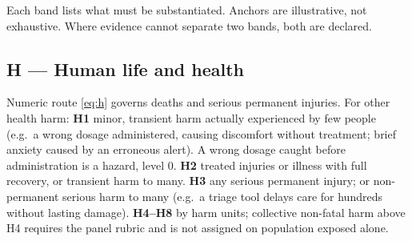 \documentclass[11pt,a4paper]{article}
\begin{document}
Each band lists what must be substantiated. Anchors are illustrative, not exhaustive. Where evidence cannot separate two bands, both are declared.

\subsection{H --- Human life and health}
Numeric route \eqref{eq:h} governs deaths and serious permanent injuries. For other health harm: \textbf{H1} minor, transient harm actually experienced by few people (e.g.\ a wrong dosage administered, causing discomfort without treatment; brief anxiety caused by an erroneous alert). A wrong dosage caught before administration is a hazard, level 0. \textbf{H2} treated injuries or illness with full recovery, or transient harm to many. \textbf{H3} any serious permanent injury; or non-permanent serious harm to many (e.g.\ a triage tool delays care for hundreds without lasting damage). \textbf{H4--H8} by harm units; collective non-fatal harm above H4 requires the panel rubric and is not assigned on population exposed alone.
\end{document}
